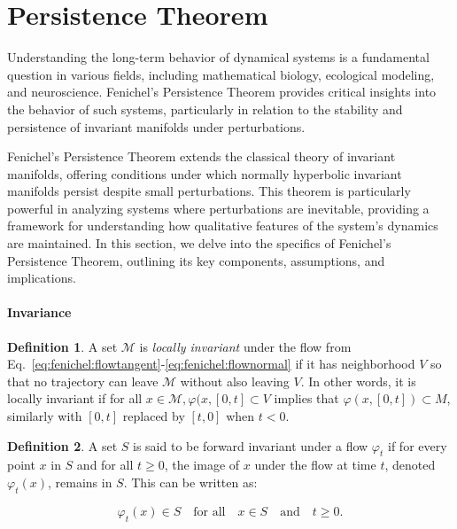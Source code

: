 \documentclass{article} %
\newcounter{ct}
\newcommand{\manifold}{\mathcal{M}}
\theoremstyle{definition}
\newtheorem{definition}{Definition}
\theoremstyle{remark}
\begin{document}
\newpage
\section{Persistence Theorem}\label{persistence_extra}
Understanding the long-term behavior of dynamical systems is a fundamental question in various fields, including mathematical biology, ecological modeling, and neuroscience.
 Fenichel's Persistence Theorem provides critical insights into the behavior of such systems, particularly in relation to the stability and persistence of invariant manifolds under perturbations.
 
Fenichel's Persistence Theorem extends the classical theory of invariant manifolds, offering conditions under which normally hyperbolic invariant manifolds persist despite small perturbations.
This theorem is particularly powerful in analyzing systems where perturbations are inevitable, providing a  framework for understanding how qualitative features of the system's dynamics are maintained.
In this section, we delve into the specifics of Fenichel's Persistence Theorem, outlining its key components, assumptions, and implications.


\paragraph{Invariance}
\begin{definition}
A set \(\manifold\) is \emph{locally invariant} under the flow from Eq.~\ref{eq:fenichel:flowtangent}-\ref{eq:fenichel:flownormal} if it has neighborhood \(V\) so that no trajectory can leave \(\manifold\) without also leaving \(V\). 
In other words, it is locally invariant if for all \(x \in \manifold, \varphi(x, [0, t] \subset V\) implies that  \(\varphi(x,[0, t]) \subset M\), similarly with \([0, t]\) replaced by \([t, 0]\) when \(t < 0\).
\end{definition}

\begin{definition}
A set \( S \) is said to be forward invariant under a flow \( \varphi_t \) if for every point \( x \) in \( S \) and for all \( t \geq 0 \), the image of \( x \) under the flow at time \( t \), denoted \( \varphi_t(x) \), remains in \( S \). This can be written as:

\[ \varphi_t(x) \in S \quad \text{for all} \quad x \in S \quad \text{and} \quad t \geq 0. \]
\end{definition}
\end{document}
